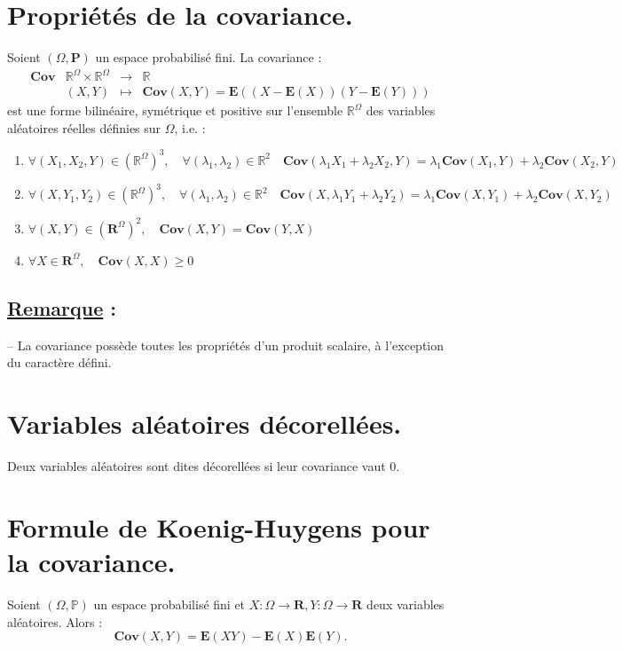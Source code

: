 \documentclass{article}
\begin{document}
\section{Propriétés de la covariance.}
Soient $(\Omega, \mathbf{P})$ un espace probabilisé fini. La covariance : 
\[
    \begin{array}{c|ccc}
        \mathbf{Cov} & \mathbb{R}^{\Omega} \times \mathbb{R}^{\Omega} & \longrightarrow & \mathbb{R}
        \\[0.3em]
                     & (X, Y)                                         & \longmapsto     & \mathbf{Cov}(X, Y) = \mathbf{E}((X - \mathbf{E}(X))(Y - \mathbf{E}(Y)))
    \end{array}
\]
est une forme bilinéaire, symétrique et positive sur l'ensemble $\mathbb{R}^{\Omega}$ des variables aléatoires réelles définies sur $\Omega$, i.e. : 
\begin{enumerate}[label=(\alph*)]
    \item $\forall (X_1, X_2, Y) \in (\mathbb{R}^{\Omega})^3, \quad \forall (\lambda_1, \lambda_2) \in \mathbb{R}^2 \quad \mathbf{Cov}(\lambda_1 X_1 + \lambda_2 X_2, Y) = \lambda_1 \mathbf{Cov}(X_1, Y) + \lambda_2 \mathbf{Cov}(X_2, Y) $
    \item $\forall (X, Y_1, Y_2) \in (\mathbb{R}^{\Omega})^3, \quad \forall (\lambda_1, \lambda_2) \in \mathbb{R}^2 \quad \mathbf{Cov}(X, \lambda_1 Y_1 + \lambda_2 Y_2) = \lambda_1 \mathbf{Cov}(X, Y_1) + \lambda_2 \mathbf{Cov}(X, Y_2) $
    \item $\forall (X, Y) \in (\mathbf{R}^{\Omega})^2, \quad \mathbf{Cov}(X, Y) = \mathbf{Cov}(Y, X)$
    \item $\forall X \in \mathbf{R}^{\Omega}, \quad \mathbf{Cov}(X, X) \geq 0$
\end{enumerate}

\subsection*{\underline{Remarque} :}
\qquad -- La covariance possède toutes les propriétés d'un produit scalaire, à l'exception du caractère défini.

\section{Variables aléatoires décorellées.}
Deux variables aléatoires sont dites décorellées si leur covariance vaut 0. 

\section{Formule de Koenig-Huygens pour la covariance.}
Soient $(\Omega, \mathbb{P})$ un espace probabilisé fini et $X : \Omega \longrightarrow \mathbf{R}, Y : \Omega \longrightarrow \mathbf{R}$ deux variables aléatoires. Alors : 
\[
    \mathbf{Cov}(X, Y) = \mathbf{E}(XY) - \mathbf{E}(X) \mathbf{E}(Y). 
\]
\end{document}
